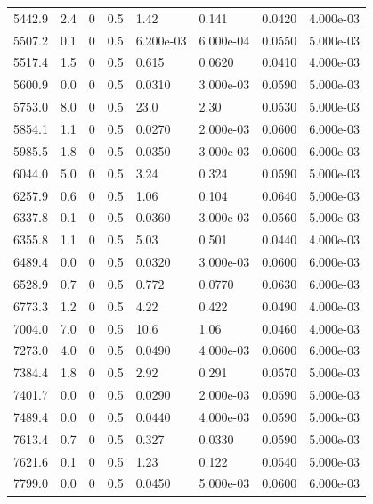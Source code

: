 \documentclass[preview]{standalone}
\begin{document}
{{{\begin{tabular}{L{1.2cm}C{1.2cm} C{0.3cm}C{0.5cm} C{1.4cm}C{1.4cm} C{1.4cm}C{1.4cm}}
  5442.9  &   2.4  & 0     & 0.5 &  1.42  & 0.141  & 0.0420 &  4.000e-03   \\ 
  5507.2  &   0.1  & 0     & 0.5 &  6.200e-03  & 6.000e-04  & 0.0550 &  5.000e-03   \\ 
  5517.4  &   1.5  & 0     & 0.5 &  0.615  & 0.0620  & 0.0410 &  4.000e-03   \\ 
  5600.9  &   0.0  & 0     & 0.5 &  0.0310  & 3.000e-03  & 0.0590 &  5.000e-03   \\ 
  5753.0  &   8.0  & 0     & 0.5 &  23.0  & 2.30  & 0.0530 &  5.000e-03   \\ 
  5854.1  &   1.1  & 0     & 0.5 &  0.0270  & 2.000e-03  & 0.0600 &  6.000e-03   \\ 
  5985.5  &   1.8  & 0     & 0.5 &  0.0350  & 3.000e-03  & 0.0600 &  6.000e-03   \\ 
  6044.0  &   5.0  & 0     & 0.5 &  3.24  & 0.324  & 0.0590 &  5.000e-03   \\ 
  6257.9  &   0.6  & 0     & 0.5 &  1.06  & 0.104  & 0.0640 &  5.000e-03   \\ 
  6337.8  &   0.1  & 0     & 0.5 &  0.0360  & 3.000e-03  & 0.0560 &  5.000e-03   \\ 
  6355.8  &   1.1  & 0     & 0.5 &  5.03  & 0.501  & 0.0440 &  4.000e-03   \\ 
  6489.4  &   0.0  & 0     & 0.5 &  0.0320  & 3.000e-03  & 0.0600 &  6.000e-03   \\ 
  6528.9  &   0.7  & 0     & 0.5 &  0.772  & 0.0770  & 0.0630 &  6.000e-03   \\ 
  6773.3  &   1.2  & 0     & 0.5 &  4.22  & 0.422  & 0.0490 &  4.000e-03   \\ 
  7004.0  &   7.0  & 0     & 0.5 &  10.6  & 1.06  & 0.0460 &  4.000e-03   \\ 
  7273.0  &   4.0  & 0     & 0.5 &  0.0490  & 4.000e-03  & 0.0600 &  6.000e-03   \\ 
  7384.4  &   1.8  & 0     & 0.5 &  2.92  & 0.291  & 0.0570 &  5.000e-03   \\ 
  7401.7  &   0.0  & 0     & 0.5 &  0.0290  & 2.000e-03  & 0.0590 &  5.000e-03   \\ 
  7489.4  &   0.0  & 0     & 0.5 &  0.0440  & 4.000e-03  & 0.0590 &  5.000e-03   \\ 
  7613.4  &   0.7  & 0     & 0.5 &  0.327  & 0.0330  & 0.0590 &  5.000e-03   \\ 
  7621.6  &   0.1  & 0     & 0.5 &  1.23  & 0.122  & 0.0540 &  5.000e-03   \\ 
  7799.0  &   0.0  & 0     & 0.5 &  0.0450  & 5.000e-03  & 0.0600 &  6.000e-03   \\ 

\end{tabular}}}}
\end{document}
